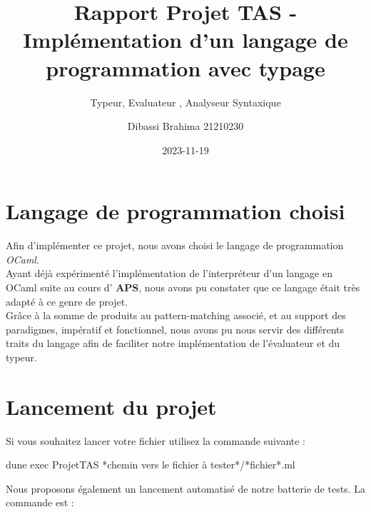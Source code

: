 \documentclass[
  12pt,
]{article}
\title{Rapport Projet TAS - Implémentation d'un langage de programmation
avec typage}
\subtitle{Typeur, Evaluateur , Analyseur Syntaxique}
\author{Dibassi Brahima 21210230}
\date{2023-11-19}
\newenvironment{Shaded}{}{}
\newcommand{\ExtensionTok}[1]{#1}
\newcommand{\NormalTok}[1]{#1}
\newcommand{\PreprocessorTok}[1]{\textcolor[rgb]{0.74,0.48,0.00}{#1}}
\begin{document}
\maketitle

\newpage

{
\hypersetup{linkcolor=}
\setcounter{tocdepth}{3}
\tableofcontents
}
\newpage

\newcommand{\grammarRule}[1]{\; \textbf{<\textcolor{Blue}{#1}>} \;}
\newcommand{\grammarRuleUnSpaced}[1]{\textbf{<\textcolor{Blue}{#1}>}}
\newcommand{\nTime}[1]{\; #1\text{*} \;}
\newcommand{\nPlus}[1]{\; #1\text{+} \;}
\newcommand{\isToken}[1]{\; \textit{`\textcolor{Maroon}{#1}`} \;}
\newcommand{\isRangeToken}[2]{\; \textit{`\textcolor{Maroon}{#1} - \textcolor{Maroon}{#2}`} \;}

\section{Langage de programmation
choisi}\label{langage-de-programmation-choisi}

Afin d'implémenter ce projet, nous avons choisi le langage de
programmation \emph{OCaml}.\\
Ayant déjà expérimenté l'implémentation de l'interpréteur d'un langage
en OCaml suite au cours d' \textbf{APS}, nous avons pu constater que ce
langage était très adapté à ce genre de projet.\\
Grâce à la somme de produits au pattern-matching associé, et au support
des paradigmes, impératif et fonctionnel, nous avons pu nous servir des
différents traits du langage afin de faciliter notre implémentation de
l'évaluateur et du typeur.

\section{Lancement du projet}\label{lancement-du-projet}

Si vous souhaitez lancer votre fichier utilisez la commande suivante :

\begin{Shaded}
\begin{Highlighting}[]
    \ExtensionTok{dune}\NormalTok{ exec ProjetTAS }\PreprocessorTok{*}\NormalTok{chemin vers le fichier à tester}\PreprocessorTok{*}\NormalTok{/}\PreprocessorTok{*}\NormalTok{fichier}\PreprocessorTok{*}\NormalTok{.ml}
\end{Highlighting}
\end{Shaded}

Nous proposons également un lancement automatisé de notre batterie de
tests. La commande est :
\end{document}
